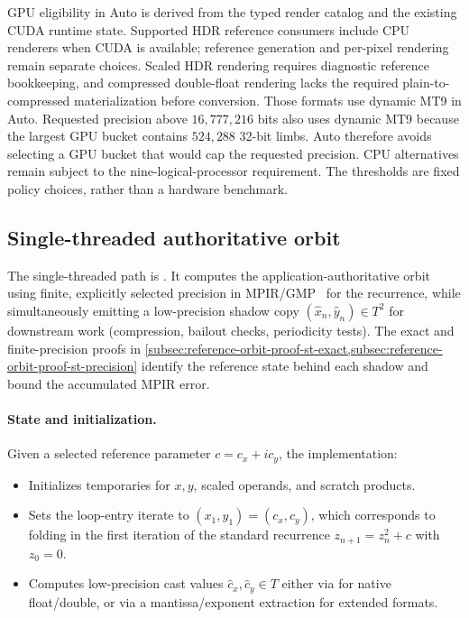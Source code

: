 GPU eligibility in Auto is derived from the typed render catalog and the existing
CUDA runtime state. Supported HDR reference consumers include CPU renderers when
CUDA is available; reference generation and per-pixel rendering remain separate
choices. Scaled HDR rendering requires diagnostic reference bookkeeping, and
compressed double-float rendering lacks the required plain-to-compressed
materialization before conversion. Those formats use dynamic MT9 in Auto. Requested
precision above $16{,}777{,}216$ bits also uses dynamic MT9 because the largest GPU
bucket contains $524{,}288$ 32-bit limbs. Auto therefore avoids selecting a GPU
bucket that would cap the requested precision. CPU alternatives remain subject
to the nine-logical-processor requirement. The thresholds are fixed policy
choices, rather than a hardware benchmark.

\subsection{Single-threaded authoritative orbit}
\label{subsec:ref-orbit-st}

The single-threaded path is
.
It computes the application-authoritative orbit using finite, explicitly selected
precision in
MPIR/GMP~\cite{MPIR_Library}  for the recurrence, while
simultaneously emitting a low-precision shadow copy
\((\hat{x}_n,\hat{y}_n)\in T^2\) for downstream work (compression,
bailout checks, periodicity tests).
The exact and finite-precision proofs in
\cref{subsec:reference-orbit-proof-st-exact,subsec:reference-orbit-proof-st-precision}
identify the reference state behind each shadow and bound the accumulated
MPIR error.

\paragraph{State and initialization.}

Given a selected reference parameter \(c = c_x + i c_y\), the implementation:

\begin{itemize}
  \item Initializes  temporaries for \(x,y\), scaled operands, and scratch products.
  \item Sets the loop-entry iterate to \((x_1,y_1) = (c_x,c_y)\), which
        corresponds to folding in the first iteration of the standard
        recurrence \(z_{n+1}=z_n^2+c\) with \(z_0=0\).
  \item Computes low-precision cast values \(\hat{c}_x,\hat{c}_y \in T\) either via  for
        native float/double, or via a mantissa/exponent extraction for extended formats.
\end{itemize}

